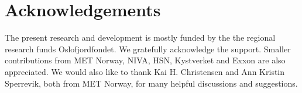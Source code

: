 \documentclass[12pt,a4paper,english]{article}
\begin{document}


\clearpage
\section*{\hspace{17mm}Acknowledgements}
The present research and development is mostly funded by the the regional research funds Oslofjordfondet. We gratefully acknowledge the support. Smaller contributions from MET Norway, NIVA, HSN, Kystverket and Exxon are also appreciated. We would also like to thank Kai H. Christensen and Ann Kristin Sperrevik, both from MET Norway, for many helpful discussions and suggestions.   




\clearpage
\pagebreak



\clearpage
\pagebreak
 
\end{document}
